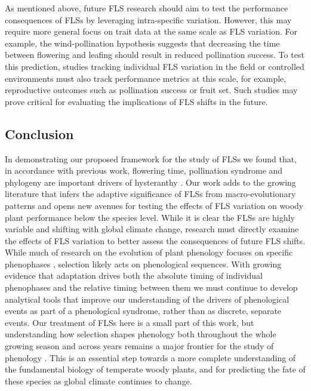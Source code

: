 \documentclass[11pt]{article}
\begin{document}
\noindent As mentioned above, future FLS research should aim to test the performance consequences of FLSs by leveraging intra-specific variation. However, this may require more general focus on trait data at the same scale as FLS variation. For example, the wind-pollination hypothesis suggests that decreasing the time between flowering and leafing should result in reduced pollination success. To test this prediction, studies tracking individual FLS variation  in the field or controlled environments must also track performance metrics at this scale, for example, reproductive outcomes such as pollination success or fruit set. Such studies may prove critical for evaluating the implications of FLS shifts in the future. \\

\subsection*{Conclusion}
\noindent In demonstrating our proposed framework for the study of FLSs we found that, in accordance with previous work, flowering time, pollination syndrome and phylogeny are important drivers of hysteranthy \citep{Gougherty2018}. Our work adds to the growing literature that infers the adaptive significance of FLSs from macro-evolutionary patterns and opens new avenues for testing the effects of FLS variation on woody plant performance below the species level. While it is clear the FLSs are highly variable and shifting with global climate change, research must directly examine the effects of FLS variation to better assess the consequences of future FLS shifts.\\

\noindent While much of research on the evolution of plant phenology focuses on specific phenophases \citep[e.g.][]{Savage2013,OLLERTON_1992}, selection likely acts on phenological sequences. With growing evidence that adaptation drives both the absolute timing of individual phenophases and the relative timing between them we must continue to develop analytical tools that improve our understanding of the drivers of phenological events as part of a phenological syndrome, rather than as discrete, separate events. 
Our treatment of FLSs here is a small part of this work, but understanding how selection shapes phenology both throughout the whole growing season and across years remains a major frontier for the study of phenology \citep{Wolkovich2014b}. This is an essential step towards a more complete understanding of the fundamental biology of temperate woody plants, and for predicting the fate of these species as global climate continues to change.
\end{document}
